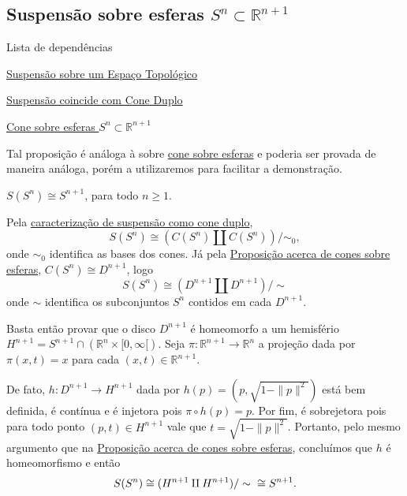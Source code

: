 \subsection{Suspensão sobre esferas $S^n\subset\mathbb{R}^{n+1}$}
\label{suspensao-esfera-prop}
\begin{titlemize}{Lista de dependências}
	\item \hyperref[suspensao-def]{Suspensão sobre um Espaço Topológico}
    \item \hyperref[suspensao-cone-duplo-prop]{Suspensão coincide com Cone Duplo}
    \item \hyperref[cone-esfera-prop]{Cone sobre esferas $S^n\subset\mathbb{R}^{n+1}$}
\end{titlemize}


Tal proposição é análoga à sobre \hyperref[cone-esfera-prop]{cone sobre esferas} e poderia ser provada de maneira análoga, porém a utilizaremos para facilitar a demonstração.

\begin{prop}
	$S(S^n) \cong S^{n+1}$, para todo $n\geq 1$.

    \begin{dem}
        Pela \hyperref[suspensao-cone-duplo-prop]{caracterização de suspensão como cone duplo}, \[S(S^n) \cong (C(S^n) \amalg C(S^n))/\sim_0,\] onde $\sim_0$ identifica as bases dos cones. Já pela \hyperref[cone-esfera-prop]{Proposição acerca de cones sobre esferas}, $C(S^n) \cong D^{n+1}$, logo \[S(S^n) \cong (D^{n+1} \amalg D^{n+1})/\sim\] onde $\sim$ identifica os subconjuntos $S^n$ contidos em cada $D^{n+1}$.
        
        Basta então provar que o disco $D^{n+1}$ é homeomorfo a um hemisfério $H^{n+1} = S^{n+1}\cap (\mathbb{R}^n \times [0,\infty[)$. Seja $\pi:\mathbb{R}^{n+1}\to\mathbb{R}^n$ a projeção dada por $\pi(x,t) = x$ para cada $(x,t) \in \mathbb{R}^{n+1}$.
        
        De fato, $h:D^{n+1}\to H^{n+1}$ dada por $h(p)=(p,\sqrt{1-\|p\|^2})$ está bem definida, é contínua e é injetora pois $\pi \circ h(p) = p$. Por fim, é sobrejetora pois para todo ponto $(p,t)\in H^{n+1}$ vale que $t=\sqrt{1-\|p\|^2}$. Portanto, pelo mesmo argumento que na \hyperref[cone-esfera-prop]{Proposição acerca de cones sobre esferas}, concluímos que $h$ é homeomorfismo e então\[S(S^n) \cong (H^{n+1} \amalg H^{n+1})/\sim \hspace{6 pt} \cong S^{n+1}.\]
    \end{dem}
\end{prop}

